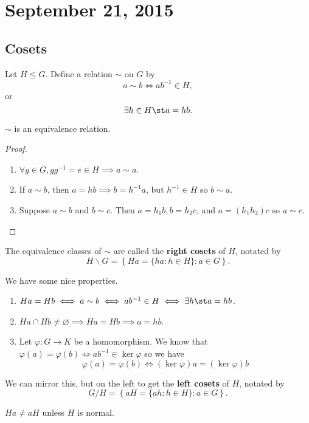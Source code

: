 \section{September 21, 2015}

\subsection{Cosets}

\begin{df}
Let $H \leq G$. Define a relation $\sim$ on $G$ by
\[ a \sim b \iff ab^{-1} \in H, \]
or
\[ \exists h \in H \st a = hb. \]
\end{df}

\begin{prop}
$\sim$ is an equivalence relation.
\end{prop}

\begin{proof}
$ $
\begin{enumerate}
\item $\forall g \in G, gg^{-1} = e \in H \implies a \sim a$.
\item If $a \sim b$, then $a = hb \implies b = h^{-1}a$, but $h^{-1} \in
H$ so $b \sim a$.
\item Suppose $a \sim b$ and $b \sim c$. Then $a = h_1 b, b = h_2 c$,
and $a = (h_1 h_2)c$ so $a \sim c$.
\end{enumerate}
\end{proof}

\begin{df}
The equivalence classes of $\sim$ are called the \textbf{right cosets}
of $H$, notated by
\[ H \backslash G = \left\lbrace Ha = \lbrace ha : h \in H \rbrace : a
\in G \right\rbrace. \]
\end{df}

\begin{rem}
We have some nice properties.
\begin{enumerate}
\item $Ha = Hb \iff a \sim b \iff ab^{-1} \in H \iff \exists h \st a =
hb$.
\item $Ha \cap Hb \neq \varnothing \implies Ha = Hb \implies a = hb$.
\item Let $\varphi : G \to K$ be a homomorphism. We know that
$\varphi(a) = \varphi(b) \iff ab^{-1} \in \ker\varphi$ so we have
\[ \varphi(a) = \varphi(b) \iff (\ker\varphi)a = (\ker\varphi)b \]
\end{enumerate}
\end{rem}

\begin{df}
We can mirror this, but on the left to get the \textbf{left cosets} of
$H$, notated by
\[ G / H = \left\lbrace aH = \lbrace ah : h \in H \rbrace : a \in G
\right\rbrace. \]
\end{df}

\begin{rem}
$Ha \neq aH$ unless $H$ is normal.
\end{rem}
